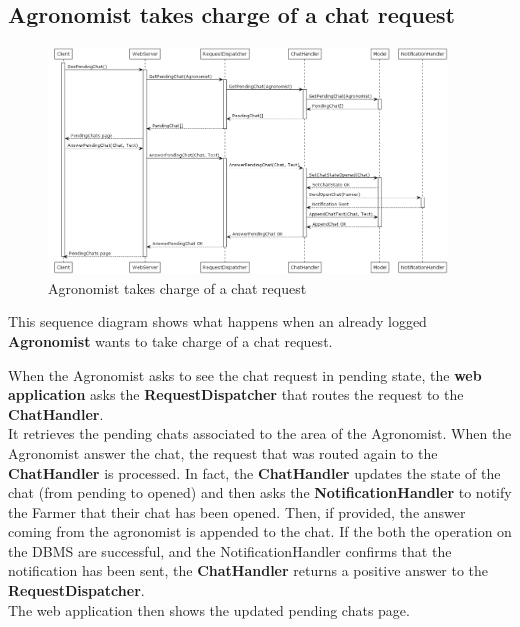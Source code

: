 \documentclass[10pt]{report}
\begin{document}
\subsection{Agronomist takes charge of a chat request}
\begin{figure}[H]
    \centering
    \includegraphics[width=400px]{SequenceDiagram/Agronomist_2_2.png}
    \caption{Agronomist takes charge of a chat request}
\end{figure}
This sequence diagram shows what happens when an already logged \textbf{Agronomist} wants to take charge of a chat request.

When the Agronomist asks to see the chat request in pending state, the \textbf{web application} asks the \textbf{RequestDispatcher} that routes the request to the \textbf{ChatHandler}.\\ It retrieves the pending chats associated to the area of the Agronomist. When the Agronomist answer the chat, the request that was routed again to the \textbf{ChatHandler} is processed. 
In fact, the \textbf{ChatHandler} updates the state of the chat (from pending to opened) and then asks the \textbf{NotificationHandler} to notify the Farmer that their chat has been opened. Then, if provided, the answer coming from the agronomist is appended to the chat. If the both the operation on the DBMS are successful, and the NotificationHandler confirms that the notification has been sent, the \textbf{ChatHandler} returns a positive answer to the \textbf{RequestDispatcher}.\\ The web application then shows the updated pending chats page.
\end{document}
